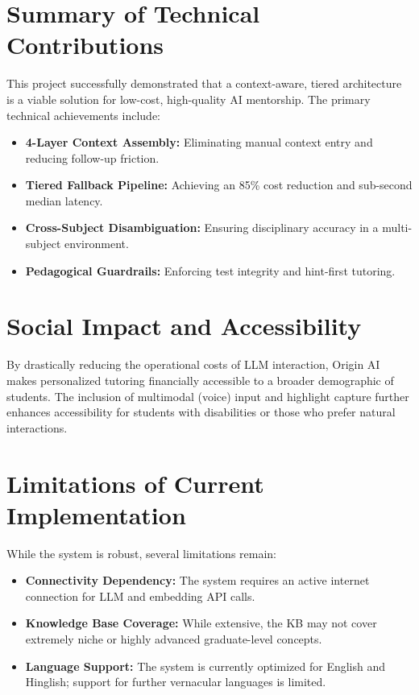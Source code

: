 \section{Summary of Technical Contributions}

This project successfully demonstrated that a context-aware, tiered architecture is a viable solution for low-cost, high-quality AI mentorship. The primary technical achievements include:
\begin{itemize}
    \item \textbf{4-Layer Context Assembly:} Eliminating manual context entry and reducing follow-up friction.
    \item \textbf{Tiered Fallback Pipeline:} Achieving an 85\% cost reduction and sub-second median latency.
    \item \textbf{Cross-Subject Disambiguation:} Ensuring disciplinary accuracy in a multi-subject environment.
    \item \textbf{Pedagogical Guardrails:} Enforcing test integrity and hint-first tutoring.
\end{itemize}

\section{Social Impact and Accessibility}

By drastically reducing the operational costs of LLM interaction, Origin AI makes personalized tutoring financially accessible to a broader demographic of students. The inclusion of multimodal (voice) input and highlight capture further enhances accessibility for students with disabilities or those who prefer natural interactions.

\section{Limitations of Current Implementation}

While the system is robust, several limitations remain:
\begin{itemize}
    \item \textbf{Connectivity Dependency:} The system requires an active internet connection for LLM and embedding API calls.
    \item \textbf{Knowledge Base Coverage:} While extensive, the KB may not cover extremely niche or highly advanced graduate-level concepts.
    \item \textbf{Language Support:} The system is currently optimized for English and Hinglish; support for further vernacular languages is limited.
\end{itemize}

